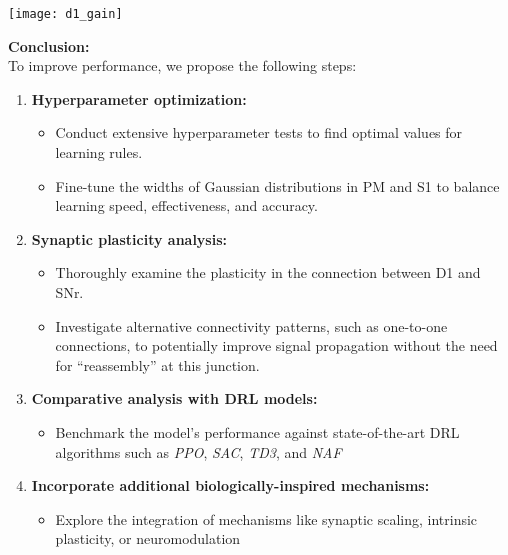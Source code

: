 \documentclass[portrait,final,a0paper,fontscale=0.374]{baposter}
\begin{document}
\begin{poster}
{\begin{adjustbox}{minipage=0.95\textwidth, margin=5pt, center}
\begin{minipage}[t]{0.34\textwidth}
			\begin{center}
				\texttt{[image: d1\_gain]}
			\end{center}
		\end{minipage}
		\hfill
		\begin{minipage}[t]{0.58\textwidth}
			\vspace{8pt}
			\textbf{Conclusion:}\\[2pt]
			To improve performance, we propose the following steps:
			\begin{enumerate}[leftmargin=*, itemsep=0pt, topsep=0pt, parsep=0pt]
			\item \textbf{Hyperparameter optimization:}
			\begin{itemize}[leftmargin=*, itemsep=0pt]
				\item Conduct extensive hyperparameter tests to find optimal values for learning rules.
				\item Fine-tune the widths of Gaussian distributions in PM and S1 to balance learning speed, effectiveness, and accuracy.
			\end{itemize}
			\item \textbf{Synaptic plasticity analysis:}
			\begin{itemize}[leftmargin=*, itemsep=0pt]
				\item Thoroughly examine the plasticity in the connection between D1 and SNr.
				\item Investigate alternative connectivity patterns, such as one-to-one connections, to potentially improve signal propagation without the need for ``reassembly'' at this junction.
			\end{itemize}
			\item \textbf{Comparative analysis with DRL models:}
			\begin{itemize}[leftmargin=*, itemsep=0pt]
				\item Benchmark the model's performance against state-of-the-art DRL algorithms such as \textit{PPO}, \textit{SAC}, \textit{TD3}, and \textit{NAF}
			\end{itemize}
			\item \textbf{Incorporate additional biologically-inspired mechanisms:}
			\begin{itemize}[leftmargin=*, itemsep=0pt]
				\item Explore the integration of mechanisms like synaptic scaling, intrinsic plasticity, or neuromodulation
			\end{itemize}
			\end{enumerate}
		\end{minipage}
		\hfill
	\end{adjustbox}

}
\end{poster}
\end{document}
